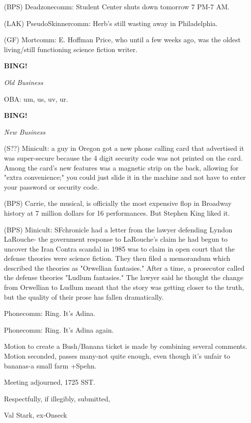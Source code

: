 \documentclass[12pt]{article}
\newcommand{\bing}{{\bf BING!} }
\newcommand{\goto}[1]{\bing \vskip 12pt \centerline{{\em{#1}}}}
\begin{document}
(BPS) Deadzonecomm: Student Center shuts down tomorrow 7 PM-7 AM.

(LAK) PseudoSkinnercomm: Herb's still wasting away in Philadelphia.

(GF) Mortcomm: E. Hoffman Price, who until a few weeks ago, was the oldest living/still functioning science fiction writer.

\goto{Old Business}

OBA: um, us, uv, ur.

\goto{New Business}

(S??) Minicult: a guy in Oregon got a new phone calling card that advertised it was super-secure because the 4 digit security code was not printed on the card. Among the card's new features was a magnetic strip on the back, allowing for "extra convenience;" you could just slide it in the machine and not have to enter your password or security code.

(BPS) Carrie, the musical, is officially the most expensive flop in Broadway history at 7 million dollars for 16 performances. But Stephen King liked it.

(BPS) Minicult: SFchronicle had a letter from the lawyer defending Lyndon LaRouche- the government response to LaRouche's claim he had begun to uncover the Iran Contra scandal in 1985 was to claim in open court that the defense theories were science fiction. They then filed a memorandum which described the theories as "Orwellian fantasies." After a time, a prosecutor called the defense theories "Ludlum fantasies." The lawyer said he thought the change from Orwellian to Ludlum meant that the story was getting closer to the truth, but the quality of their prose has fallen dramatically.

Phonecomm: Ring. It's Adina.

Phonecomm: Ring. It's Adina again.

Motion to create a Bush/Banana ticket is made by combining several comments. Motion seconded, passes many-not quite enough, even though it's unfair to bananas-a small farm +Spehn.

\vspace{12pt}

\noindent
Meeting adjourned, 1725 SST.

\vspace{18pt}

\centerline{Respectfully, if illegibly, submitted,}
\centerline{Val Stark, ex-Onseck}
\end{document}
